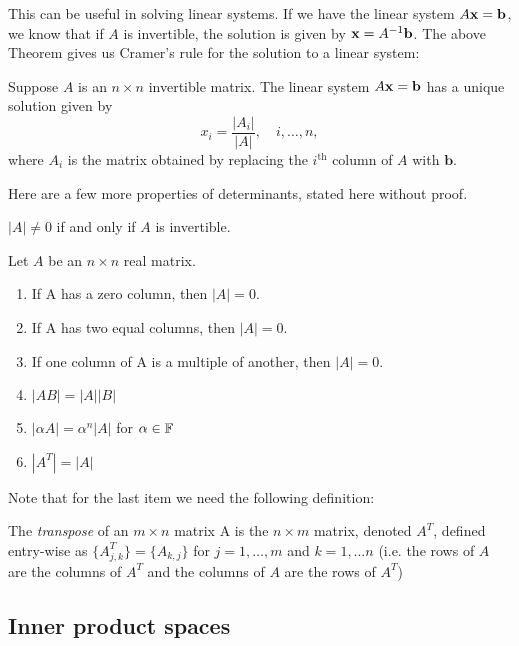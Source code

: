 \documentclass{article}
\begin{document}
This can be useful in solving linear systems. If we have the linear system $A{\mathbf{x}} = \mathbf{b}$, we know that if $A$ is invertible, the solution is given by ${\mathbf{x}} = A^{-1} \mathbf{b}$. The above Theorem gives us Cramer's rule for the solution to a linear system:
\begin{corollary}
Suppose $A$ is an $n \times n$ invertible matrix. The linear system $A{\mathbf{x}} = \mathbf{b}$ has a unique solution given by
\begin{equation*}
    x_i = \frac{|A_i|}{|A|}, \quad i, \ldots, n,
\end{equation*}
where $A_i$ is the matrix obtained by replacing the $i^\text{th}$ column of $A$ with $\mathbf{b}$.
\end{corollary}

Here are a few more properties of determinants, stated here without proof.

\begin{proposition}
\label{prop:A_invertible}
$|A| \neq 0$ if and only if $A$ is invertible.
\end{proposition}

\begin{proposition}
Let $A$ be an $n \times n$ real matrix.
\begin{enumerate}
    \item If A has a zero column, then $|A| = 0$.
\item If A has two equal columns, then $|A| = 0$.
\item If one column of A is a multiple of another, then $|A| = 0$.
\item $|AB| = |A| |B|$
\item $|\alpha A| = \alpha^n |A|$ for $\alpha \in {\mathbb{F}}$
\item $|A^T| = |A|$
\end{enumerate}
\end{proposition}

Note that for the last item we need the following definition:

\begin{definition}
The \emph{transpose} of an $m \times n$ matrix A is the $n \times m$ matrix, denoted $A^T$, defined entry-wise as $\{A^T_{j,k}\} = \{A_{k,j}\}$ for $j=1,\ldots,m$ and $k=1,\ldots n$ (i.e. the rows of $A$ are the columns of $A^T$ and the columns of $A$ are the rows of $A^T$)
\end{definition}



\subsection{Inner product spaces}
\end{document}

